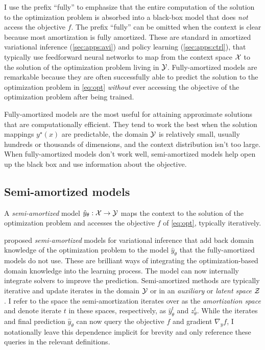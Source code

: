 I use the prefix ``fully'' to emphasize
that the entire computation of the solution to the
optimization problem is absorbed into
a black-box model that does \emph{not} access the objective $f$.
The prefix ``fully'' can be omitted when the context is clear
because most amortization is fully amortized.
These are standard in amortized variational inference
(\cref{sec:apps:avi}) and policy
learning (\cref{sec:apps:ctrl}), that typically use
feedforward neural networks to map from
the context space ${\mathcal{X}}$ to the solution of the
optimization problem living in ${\mathcal{Y}}$.
Fully-amortized models are remarkable because they
are often successfully able to predict the solution
to the optimization problem in \cref{eq:opt}
\emph{without} ever accessing the objective of
the optimization problem after being trained.

Fully-amortized models are the most useful for attaining approximate
solutions that are computationally efficient.
They tend to work the best when the
solution mappings $y^\star(x)$ are predictable,
the domain ${\mathcal{Y}}$ is relatively small,
usually hundreds or thousands of dimensions,
and the context distribution isn't too large.
When fully-amortized models don't work well,
semi-amortized models help open up the black box
and use information about the objective.

\subsection{Semi-amortized models}
\label{sec:model:semi}
\begin{definition}
  A \emph{semi-amortized} model $\hat y_\theta: {\mathcal{X}}\rightarrow{\mathcal{Y}}$
  maps the context to the solution of the optimization problem
  and accesses the objective $f$ of \cref{eq:opt},
  typically iteratively.
\end{definition}

\citet{kim2018semi,marino2018iterative}
proposed \emph{semi-amortized} models for variational inference
that add back domain knowledge of the optimization problem
to the model $\hat y_\theta$ that the fully-amortized
models do not use.
These are brilliant ways of integrating the optimization-based
domain knowledge into the learning process.
The model can now internally integrate
solvers to improve the prediction.
Semi-amortized methods are typically iterative and update
iterates in the domain ${\mathcal{Y}}$ or in an \emph{auxiliary}
or \emph{latent space} ${\mathcal{Z}}$.
I refer to the space the semi-amortization iterates over
as the \emph{amortization space} and denote iterate $t$
in these spaces, respectively, as $\hat y^{t}_\theta$ and $z^t_\theta$.
While the iterates and final prediction $\hat y_\theta$
can now query the objective $f$ and gradient $\nabla_y f$,
I notationally leave this dependence implicit for
brevity and only reference these queries in the relevant definitions.

